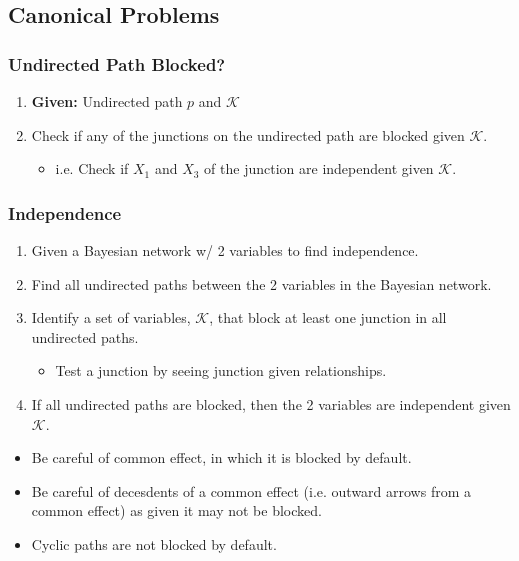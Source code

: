 \subsection{Canonical Problems}
\subsubsection{Undirected Path Blocked?}
\begin{process}
    \begin{enumerate}
        \item \textbf{Given:} Undirected path $p$ and $\mathcal{K}$
        \item Check if any of the junctions on the undirected path are blocked given $\mathcal{K}$.
        \begin{itemize}
            \item i.e. Check if $X_1$ and $X_3$ of the junction are independent given $\mathcal{K}$.
        \end{itemize}
    \end{enumerate}
\end{process}

\subsubsection{Independence}
\begin{process}
    \begin{enumerate}
        \item Given a Bayesian network w/ 2 variables to find independence.
        \item Find all undirected paths between the 2 variables in the Bayesian network.
        \item Identify a set of variables, $\mathcal{K}$, that block at least one junction in all undirected paths.
        \begin{itemize}
            \item Test a junction by seeing junction given relationships. 
        \end{itemize}
        \item If all undirected paths are blocked, then the 2 variables are independent given $\mathcal{K}$.
    \end{enumerate}
\end{process}

\begin{warning}
    \begin{itemize}
        \item Be careful of common effect, in which it is blocked by default. 
        \item Be careful of decesdents of a common effect (i.e. outward arrows from a common effect) as given it may not be blocked.
        \item Cyclic paths are not blocked by default.
    \end{itemize}
\end{warning}

